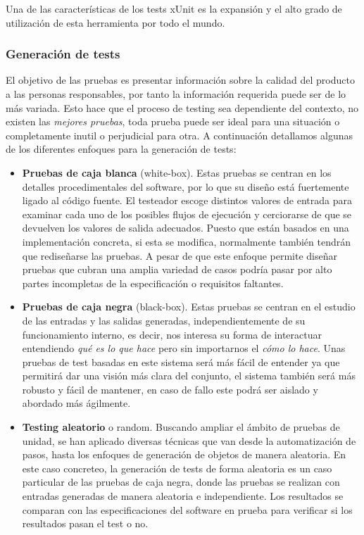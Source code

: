Una de las caracter\'isticas de los tests xUnit es la expansi\'on y el alto grado de utilizaci\'on de esta herramienta por todo el mundo.



\subsubsection*{Generaci\'on de tests}

El objetivo de las pruebas es presentar informaci\'on sobre la calidad del producto a las personas responsables, por tanto la informaci\'on requerida puede ser de lo m\'as variada. Esto hace que el proceso de testing sea dependiente del contexto, no existen las {\it mejores pruebas}, toda prueba puede ser ideal para una situaci\'on o completamente inutil o perjudicial para otra. A continuaci\'on detallamos algunas de los diferentes enfoques para la generaci\'on de tests:
\begin{itemize}
\item \textbf{Pruebas de caja blanca} (white-box). Estas pruebas se centran en los detalles procedimentales del software, por lo que su dise\~no est\'a fuertemente ligado al c\'odigo fuente. El testeador escoge distintos valores de entrada para examinar cada uno de los posibles flujos de ejecuci\'on y cerciorarse de que se devuelven los valores de salida adecuados. Puesto que est\'an basados en una implementaci\'on concreta, si esta se modifica, normalmente tambi\'en tendr\'an que redise\~narse las pruebas. A pesar de que este enfoque permite dise\~nar pruebas que cubran una amplia variedad de casos podr\'ia pasar por alto partes incompletas de la especificaci\'on o requisitos faltantes.
\item \textbf{Pruebas de caja negra} (black-box). Estas pruebas se centran en el estudio de las entradas y las salidas generadas, independientemente de su funcionamiento interno, es decir, nos interesa su forma de interactuar entendiendo {\it qu\'e es lo que hace} pero sin importarnos el {\it c\'omo lo hace}. Unas pruebas de test basadas en este sistema ser\'a m\'as f\'acil de entender ya que permitir\'a dar una visi\'on m\'as clara del conjunto, el sistema tambi\'en ser\'a m\'as robusto y f\'acil de mantener, en caso de fallo este podr\'a ser aislado y abordado m\'as \'agilmente.
\item \textbf{Testing aleatorio} o random. Buscando ampliar el \'ambito de pruebas de unidad, se han aplicado diversas t\'ecnicas que van desde la automatizaci\'on de pasos, hasta los enfoques de generaci\'on de objetos de manera aleatoria. En este caso concreteo, la generaci\'on de tests de forma aleatoria es un caso particular de las pruebas de caja negra, donde las pruebas se realizan con entradas generadas de manera aleatoria e independiente. Los resultados se comparan con las especificaciones del software en prueba para verificar si los resultados pasan el test o no.

\end{itemize}

